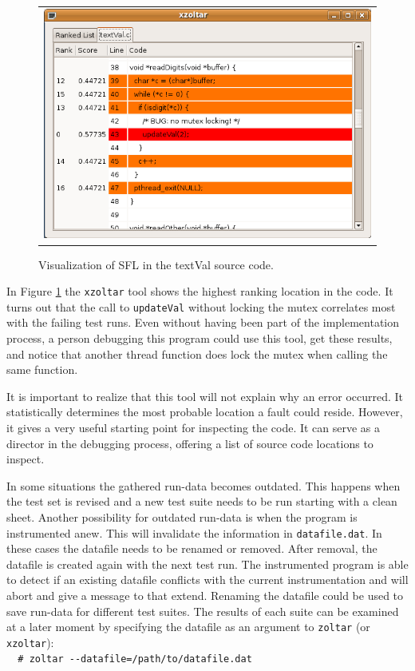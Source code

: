 	\begin{figure}[h!]
		\begin{center}
		\begin{tabular}{c}
			\includegraphics[scale=0.40]{sources/ganalyze_textVal.png} \\
		\end{tabular}
		\end{center}
		\caption{Visualization of SFL in the textVal source code.}
		\label{fig:ganalyzeTextVal}
	\end{figure}
	
	In Figure \ref{fig:ganalyzeTextVal} the \verb|xzoltar| tool shows the 
	highest ranking location in the code.
	It turns out that the call to \verb|updateVal| without locking the mutex
	correlates most with the failing test runs.
	Even without having been part of the implementation process,
	a person debugging this program could use this tool, get these results,
	and notice that another thread function does lock the mutex when calling the same function.
		
	It is important to realize that this tool will not explain why an error occurred.
	It statistically determines the most probable location a fault could reside.
	However, it gives a very useful starting point for inspecting the code.
	It can serve as a director in the debugging process,
	offering a list of source code locations to inspect.

	In some situations the gathered run-data becomes outdated.
	This happens when the test set is revised and a new test suite needs to
	be run starting with a clean sheet.
	Another possibility for outdated run-data is when the program
	is instrumented anew.
	This will invalidate the information in \verb|datafile.dat|.
	In these cases the datafile needs to be renamed or removed.
	After removal, the datafile is created again with the next test run.
	The instrumented program is able to detect if an existing datafile
	conflicts with the current instrumentation
	and will abort and give a message to that extend.
	Renaming the datafile could be used to save run-data for different
	test suites.
	The results of each suite can be examined at a later moment by 
	specifying the datafile as an argument to \verb|zoltar| (or \verb|xzoltar|):\\
	\verb|  # zoltar --datafile=/path/to/datafile.dat|\\


